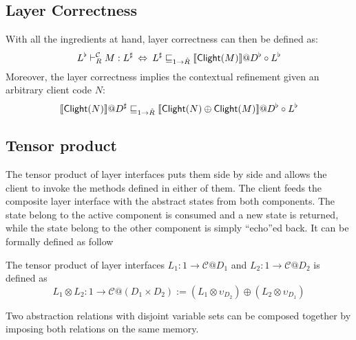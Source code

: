 \documentclass[acmsmall,review,anonymous]{acmart}\settopmatter{printfolios=true,printccs=false,printacmref=false}
\begin{document}

\subsection{Layer Correctness} %
\label{sec:ccal:correctness}

With all the ingredients at hand,
layer correctness can then be defined as:
\[
  L^\flat \vdash_R^\mathcal{C} M : L^\sharp
  \:\Leftrightarrow\:
  L^\sharp \sqsubseteq_{1 \rightarrow \hat{R}}
  \llbracket  \mathsf{Clight} (M) \rrbracket
  @D^\flat \circ L^\flat
\]
Moreover, the layer correctness implies
the contextual refinement given an arbitrary client code $N$:
\[
  \llbracket  \mathsf{Clight} (N) \rrbracket @ D^\sharp
  \sqsubseteq_{1 \rightarrow \hat{R}}
  \llbracket  \mathsf{Clight} (N) \oplus  \mathsf{Clight} (M) \rrbracket
  @D^\flat \circ L^\flat
\]


\subsection{Tensor product} %
\label{sec:ccal:tcomp}
The tensor product of layer interfaces
puts them side by side
and allows the client
to invoke the methods
defined in either of them.
The client feeds the composite layer interface
with the abstract states from both components.
The state belong to the active component
is consumed
and a new state is returned,
while the state belong to the other component
is simply ``echo''ed back.
It can be formally defined as follow

\begin{definition}
  The tensor product of layer interfaces
  $L_1 : 1 \rightarrow \mathcal{C}@D_1$
  and
  $L_2 : 1 \rightarrow \mathcal{C}@D_2$
  is defined as
  \[
    L_1 \otimes L_2 : 1 \rightarrow \mathcal{C}@(D_1 \times D_2) :=
    (L_1 \otimes \upsilon_{D_2}) \oplus
    (L_2 \otimes \upsilon_{D_1})
  \]
\end{definition}

Two abstraction relations with disjoint variable sets
can be composed together
by imposing both relations on the same memory.
\end{document}
